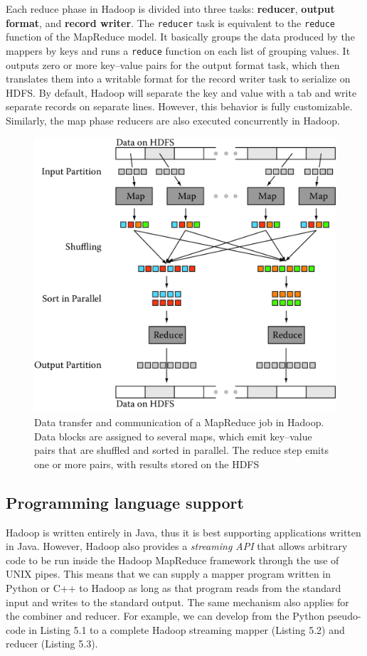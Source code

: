 \documentclass[]{krantz}
\begin{document}
Each reduce phase in Hadoop is divided into three tasks:
\textbf{reducer}, \textbf{output format}, and \textbf{record writer}.
The \texttt{reducer} task is equivalent to the \texttt{reduce} function
of the MapReduce model. It basically groups the data produced by the
mappers by keys and runs a \texttt{reduce} function on each list of
grouping values. It outputs zero or more key--value pairs for the output
format task, which then translates them into a writable format for the
record writer task to serialize on HDFS. By default, Hadoop will
separate the key and value with a tab and write separate records on
separate lines. However, this behavior is fully customizable. Similarly,
the map phase reducers are also executed concurrently in Hadoop.

\begin{figure}

{\centering \includegraphics[width=0.7\linewidth]{ChapterParallel/figures/hadoop} 

}

\caption{Data transfer and communication of a MapReduce job in Hadoop. Data blocks are assigned to several maps, which emit key--value pairs that are shuffled and sorted in parallel. The reduce step emits one or more pairs, with results stored on the HDFS}\label{fig:hadoop}
\end{figure}

\subsection{Programming language
support}\label{programming-language-support}

\enlargethispage{6pt} Hadoop is written entirely in Java, thus it is
best supporting applications written in Java. However, Hadoop also
provides a \emph{streaming API} that allows arbitrary code to be run
inside the Hadoop MapReduce framework through the use of UNIX pipes.
This means that we can supply a mapper program written in Python or C++
to Hadoop as long as that program reads from the standard input and
writes to the standard output. The same mechanism also applies for the
combiner and reducer. For example, we can develop from the Python
pseudo-code in Listing 5.1 to a complete Hadoop streaming mapper
(Listing 5.2) and reducer (Listing 5.3).
\end{document}
